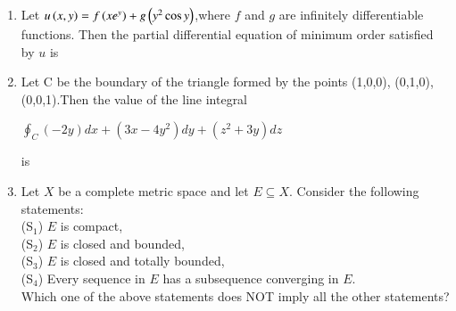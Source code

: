 \documentclass[journal]{IEEEtran}
\begin{document}
\begin{enumerate}
\begin{enumerate}
\end{enumerate}
\item Let $u\left(x, y\right) = f\left(xe^y\right) + g\left(y^2 \cos y\right)$,where $f$ and $g$ are infinitely differentiable functions. Then the partial differential equation of minimum order satisfied by $u$ is
\begin{enumerate}
\end{enumerate}
\item Let  C  be the boundary of the triangle formed by the points  (1,0,0), (0,1,0), (0,0,1).Then the value of the line integral  \begin{center} $ \oint_C (-2y)dx + (3x-4y^2)dy + (z^2+3y)dz $ \end{center} is
\begin{enumerate}
\end{enumerate}
\item Let $X$ be a complete metric space and let $E \subseteq X$. Consider the following statements: \\
(S$_1$) $E$ is compact, \\
(S$_2$) $E$ is closed and bounded, \\
(S$_3$) $E$ is closed and totally bounded, \\
(S$_4$) Every sequence in $E$ has a subsequence converging in $E$. \\
Which one of the above statements does NOT imply all the other statements?  
\begin{enumerate}
\end{enumerate}
\end{enumerate}
\end{document}
